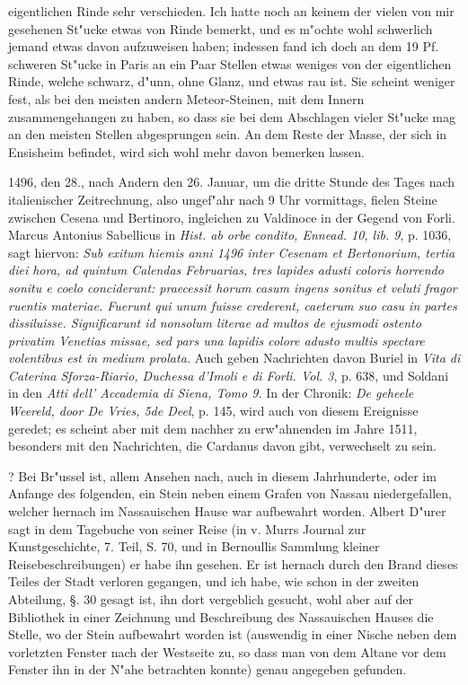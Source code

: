\documentclass[a4paper, 11pt, oneside, polutonikogreek, german]{article}
\begin{document}
eigentlichen Rinde sehr verschieden. Ich hatte noch an keinem der vielen von mir gesehenen St"ucke etwas von Rinde bemerkt, und es m"ochte wohl schwerlich jemand etwas davon aufzuweisen haben; indessen fand ich doch an dem 19 Pf. schweren St"ucke in Paris an ein Paar Stellen etwas weniges von der eigentlichen Rinde, welche schwarz, d"unn, ohne Glanz, und etwas rau ist. Sie scheint weniger fest, als bei den meisten andern Meteor-Steinen, mit dem Innern zusammengehangen zu haben, so dass sie bei dem Abschlagen vieler St"ucke mag an den meisten Stellen abgesprungen sein. An dem Reste der Masse, der sich in Ensisheim befindet, wird sich wohl mehr davon bemerken lassen.

1496, den 28., nach Andern den 26. Januar, um die dritte Stunde des Tages nach italienischer Zeitrechnung, also ungef"ahr nach 9 Uhr vormittags, fielen Steine zwischen Cesena und Bertinoro, ingleichen zu Valdinoce in der Gegend von Forli. Marcus Antonius Sabellicus in \emph{Hist. ab orbe condito, Ennead. 10, lib. 9}, p. 1036, sagt hiervon: \emph{Sub exitum hiemis anni 1496 inter Cesenam et Bertonorium, tertia diei hora, ad quintum Calendas Februarias, tres lapides adusti coloris horrendo sonitu e coelo conciderunt: praecessit horum casum ingens sonitus et veluti fragor ruentis materiae. Fuerunt qui unum fuisse crederent, caeterum suo casu in partes dissiluisse. Significarunt id nonsolum literae ad multos de ejusmodi ostento privatim Venetias missae, sed pars una lapidis colore adusto multis spectare volentibus est in medium prolata.} Auch geben Nachrichten davon Buriel in \emph{Vita di Caterina Sforza-Riario, Duchessa d'Imoli e di Forli. Vol. 3}, p. 638, und Soldani in den \emph{Atti dell' Accademia di Siena, Tomo 9.} In der Chronik: \emph{De geheele Weereld, door De Vries, 5de Deel}, p. 145, wird auch von diesem Ereignisse geredet; es scheint aber mit dem nachher zu erw"ahnenden im Jahre 1511, besonders mit den Nachrichten, die Cardanus davon gibt, verwechselt zu sein.

? Bei Br"ussel ist, allem Ansehen nach, auch in diesem Jahrhunderte, oder im Anfange des folgenden, ein Stein neben einem Grafen von Nassau niedergefallen, welcher hernach im Nassauischen Hause war aufbewahrt worden. Albert D"urer sagt in dem Tagebuche von seiner Reise (in v. Murrs Journal zur Kunstgeschichte, 7. Teil, S. 70, und in Bernoullis Sammlung kleiner Reisebeschreibungen) er habe ihn gesehen. Er ist hernach durch den Brand dieses Teiles der Stadt verloren gegangen, und ich habe, wie schon in der zweiten Abteilung, §. 30 gesagt ist, ihn dort vergeblich gesucht, wohl aber auf der Bibliothek in einer Zeichnung und Beschreibung des Nassauischen Hauses die Stelle, wo der Stein aufbewahrt worden ist (auswendig in einer Nische neben dem vorletzten Fenster nach der Westseite zu, so dass man von dem Altane vor dem Fenster ihn in der N"ahe betrachten konnte) genau angegeben gefunden.
\end{document}
